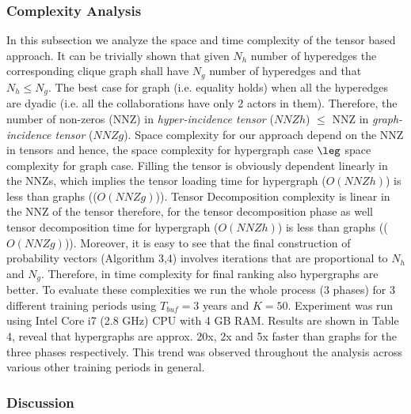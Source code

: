 \documentclass{sig-alternate}
\begin{document}

\subsubsection{Complexity Analysis}

In this subsection we analyze the space and time complexity of the tensor based approach. It can be trivially shown that given $N_h$ number of hyperedges the corresponding clique graph shall have $N_g$ number of hyperedges and that $N_h \leq N_g$. The best case for graph (i.e. equality holds) when all the hyperedges are dyadic (i.e. all the collaborations have only 2 actors in them). Therefore, the number of non-zeros (NNZ) in \textit{hyper-incidence tensor} ($NNZh$) $\leq$ NNZ in \textit{graph-incidence tensor} ($NNZg$). Space complexity for our approach depend on the NNZ in tensors and hence, the space complexity for hypergraph case $\leg$ space complexity for graph case. Filling the tensor is obviously dependent linearly in the NNZs, which implies the tensor loading time for hypergraph ($O(NNZh)$) is less than graphs (($O(NNZg)$)). Tensor Decomposition complexity is linear in the NNZ of the tensor \cite{kolda11} therefore, for the tensor decomposition phase as well tensor decomposition time for hypergraph ($O(NNZh)$) is less than graphs (($O(NNZg)$)). Moreover, it is easy to see that the final construction of probability vectors (Algorithm 3,4) involves iterations that are proportional to $N_h$ and $N_g$. Therefore, in time complexity for final ranking also hypergraphs are better. To evaluate these complexities we run the whole process (3 phases) for 3 different training periods using $T_{buf}=3$ years and $K=50$. Experiment was run using Intel Core i7 (2.8 GHz) CPU with 4 GB RAM. Results are shown in Table 4, reveal that hypergraphs are approx. 20x, 2x and 5x faster than graphs for the three phases respectively. This trend was observed throughout the analysis across various other training periods in general. 

\subsubsection{Discussion}
\end{document}
